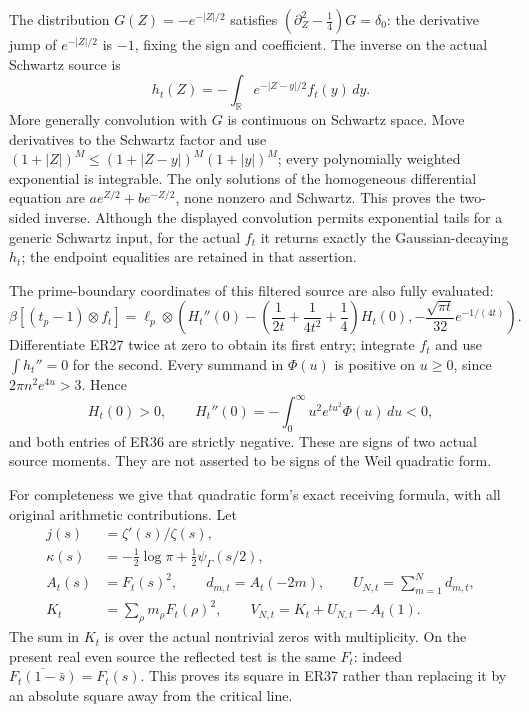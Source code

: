 The distribution \(G(Z)=-e^{-|Z|/2}\) satisfies
\((\partial_Z^2-\tfrac14)G=\delta_0\): the derivative jump
of \(e^{-|Z|/2}\) is \(-1\), fixing the sign and coefficient.
The inverse on the actual Schwartz source is
\[
 h_t(Z)=-\int_{\mathbb R}e^{-|Z-y|/2}f_t(y)\,dy .
 \tag{ER35}
\]
More generally convolution with \(G\) is continuous on Schwartz
space. Move derivatives to the Schwartz factor and use
\((1+|Z|)^M\le(1+|Z-y|)^M(1+|y|)^M\);
every polynomially weighted exponential is integrable.
The only solutions of the homogeneous differential equation
are \(ae^{Z/2}+be^{-Z/2}\), none nonzero and Schwartz.
This proves the two-sided inverse. Although the displayed convolution
permits exponential tails for a generic Schwartz input, for the
actual \(f_t\) it returns exactly the Gaussian-decaying \(h_t\);
the endpoint equalities are retained in that assertion.

The prime-boundary coordinates of this filtered source are also
fully evaluated:
\[
 \boxed{\beta[(t_p-1)\otimes f_t]
 =\ell_p\otimes\left(
 H_t''(0)-
 \left(\frac1{2t}+\frac1{4t^2}+\frac14\right)H_t(0),
 -\frac{\sqrt{\pi t}}{32}e^{-1/(4t)}
 \right).}
 \tag{ER36}
\]
Differentiate ER27 twice at zero to obtain its first entry;
integrate \(f_t\) and use \(\int h_t''=0\) for the second.
Every summand in \(\Phi(u)\) is positive on \(u\ge0\), since
\(2\pi n^2e^{4u}>3\). Hence
\[
 H_t(0)>0,\qquad
 H_t''(0)=-\int_0^\infty u^2e^{tu^2}\Phi(u)\,du<0,
\]
and both entries of ER36 are strictly negative. These are signs
of two actual source moments. They are not asserted to be signs
of the Weil quadratic form.

For completeness we give that quadratic form's exact receiving
formula, with all original arithmetic contributions. Let
\[
 \begin{split}
 j(s)&=\zeta'(s)/\zeta(s),\\
 \kappa(s)&=-\tfrac12\log\pi+\tfrac12\psi_\Gamma(s/2),\\
 A_t(s)&=F_t(s)^2,\qquad
 d_{m,t}=A_t(-2m),\qquad U_{N,t}=\sum_{m=1}^Nd_{m,t},\\
 K_t&=\sum_{\rho}m_\rho F_t(\rho)^2,\qquad
 V_{N,t}=K_t+U_{N,t}-A_t(1).
 \end{split}
 \tag{ER37}
\]
The sum in \(K_t\) is over the actual nontrivial zeros with
multiplicity. On the present real even source the reflected
test is the same \(F_t\): indeed
\(\overline{F_t(1-\bar s)}=F_t(s)\).
This proves its square in ER37 rather than replacing it by an
absolute square away from the critical line.

